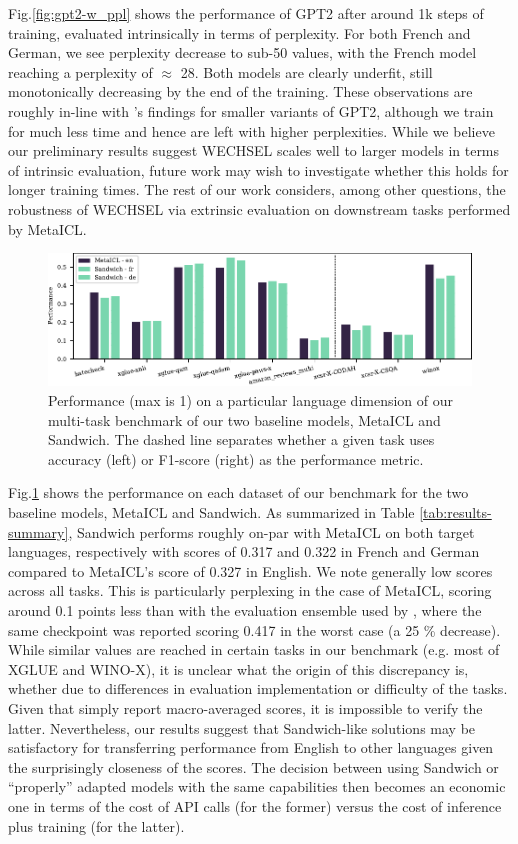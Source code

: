 \documentclass[11pt]{article}
\begin{document}
Fig.\@ \ref{fig:gpt2-w_ppl} shows the performance of GPT2 after around 1k steps of training,
evaluated intrinsically in terms of perplexity. For both French and German, we see perplexity
decrease to sub-50 values, with the French model reaching a perplexity of $\approx$ 28. Both models
are clearly underfit, still monotonically decreasing by the end of the training. These observations
are roughly in-line with \citet{minixhofer_wechsel_2022}'s findings for smaller variants of GPT2,
although we train for much less time and hence are left with higher perplexities. While we believe
our preliminary results suggest WECHSEL scales well to larger models in terms of intrinsic
evaluation, future work may wish to investigate whether this holds for longer training times. The
rest of our work considers, among other questions, the robustness of WECHSEL via extrinsic
evaluation on downstream tasks performed by MetaICL.

\begin{figure}[ht]
	\includegraphics{baselines.pdf}
	\caption{Performance (max is 1) on a particular language dimension of our multi-task benchmark of
		our two baseline models, MetaICL and Sandwich. The dashed line separates whether a given task uses
		accuracy (left) or F1-score (right) as the performance metric.}
	\label{fig:baselines}
\end{figure}

Fig.\@ \ref{fig:baselines} shows the performance on each dataset of our benchmark for the two
baseline models, MetaICL and Sandwich. As summarized in Table \ref{tab:results-summary}, Sandwich
performs roughly on-par with MetaICL on both target languages, respectively with scores of 0.317 and
0.322 in French and German compared to MetaICL's score of 0.327 in English. We note generally low
scores across all tasks. This is particularly perplexing in the case of MetaICL, scoring around
0.1 points less than with the evaluation ensemble used by \citet{min_metaicl_2022}, where the same
checkpoint was reported scoring 0.417 in the worst case (a 25 \% decrease). While similar values
are reached in certain tasks in our benchmark (e.g. most of XGLUE and WINO-X), it is unclear what
the origin of this discrepancy is, whether due to differences in evaluation implementation or
difficulty of the tasks. Given that \citet{min_metaicl_2022} simply report macro-averaged scores,
it is impossible to verify the latter. Nevertheless, our results suggest that Sandwich-like
solutions may be satisfactory for transferring performance from English to other languages given
the surprisingly closeness of the scores. The decision between using Sandwich or ``properly''
adapted models with the same capabilities then becomes an economic one in terms of the cost of API
calls (for the former) versus the cost of inference plus training (for the latter).
\end{document}
